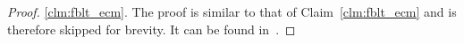 \documentclass[prodmode,acmtecs]{acmsmall}
\begin{document}
\begin{compactenum}
\begin{proof}
\ref{clm:fblt_ecm}.
The proof is similar to that of Claim~\ref{clm:fblt_ecm} and is therefore skipped for  brevity.  It can be found in~\cite{stmconcurrencycontrol_techreport}.

\end{proof}
\end{compactenum}
\end{document}
